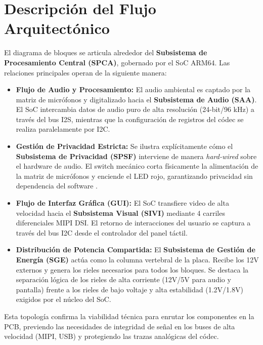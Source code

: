 \documentclass[%
	paper=a4,
	twoside=false,
	parskip=half,
	chapterprefix=false,
	10pt,
	headings=normal,
	bibliography=totoc,
	listof=totoc,
	titlepage=on,
	captions=tableabove,
	draft=false, 
]{scrbook}%
\begin{document}
\section{Descripción del Flujo Arquitectónico}

El diagrama de bloques se articula alrededor del \textbf{Subsistema de Procesamiento Central (SPCA)}, gobernado por el SoC ARM64. Las relaciones principales operan de la siguiente manera:

\begin{itemize}
    \item \textbf{Flujo de Audio y Procesamiento:} El audio ambiental es captado por la matriz de micrófonos y digitalizado hacia el \textbf{Subsistema de Audio (SAA)}. El SoC intercambia datos de audio puro de alta resolución (24-bit/96 kHz) a través del bus I2S, mientras que la configuración de registros del códec se realiza paralelamente por I2C.
    \item \textbf{Gestión de Privacidad Estricta:} Se ilustra explícitamente cómo el \textbf{Subsistema de Privacidad (SPSF)} interviene de manera \textit{hard-wired} sobre el hardware de audio. El switch mecánico corta físicamente la alimentación de la matriz de micrófonos y enciende el LED rojo, garantizando privacidad sin dependencia del software \cite{guia_proyecto_final}.
    \item \textbf{Flujo de Interfaz Gráfica (GUI):} El SoC transfiere video de alta velocidad hacia el \textbf{Subsistema Visual (SIVI)} mediante 4 carriles diferenciales MIPI DSI. El retorno de interacciones del usuario se captura a través del bus I2C desde el controlador del panel táctil.
    \item \textbf{Distribución de Potencia Compartida:} El \textbf{Subsistema de Gestión de Energía (SGE)} actúa como la columna vertebral de la placa. Recibe los 12V externos y genera los rieles necesarios para todos los bloques. Se destaca la separación lógica de los rieles de alta corriente (12V/5V para audio y pantalla) frente a los rieles de bajo voltaje y alta estabilidad (1.2V/1.8V) exigidos por el núcleo del SoC.
\end{itemize}

Esta topología confirma la viabilidad técnica para enrutar los componentes en la PCB, previendo las necesidades de integridad de señal en los buses de alta velocidad (MIPI, USB) y protegiendo las trazas analógicas del códec.

\end{document}
